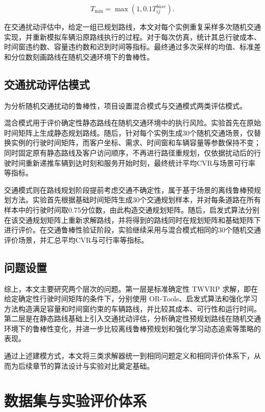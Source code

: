\documentclass[12pt,a4paper,UTF8]{article}
\begin{document}
\begin{equation}
    T_{\min}=\max(1,0.1T^{base}_{ij}).
    \label{eq:traffic_lower_bound}
\end{equation}

在交通扰动评估中，给定一组已规划路线，本文对每个实例重复采样多次随机交通实现，并重新模拟车辆沿原路线执行的过程。对于每次仿真，统计其总行驶成本、时间窗违约数、容量违约数和迟到时间等指标。最终通过多次采样的均值、标准差和分位数刻画路线在随机交通环境下的鲁棒性。

\subsection{交通扰动评估模式}
为分析随机交通扰动的鲁棒性，项目设置混合模式与交通模式两类评估模式。

混合模式用于评价确定性静态路线在随机交通环境中的执行风险。实验首先在原始时间矩阵上生成静态规划路线。随后，针对每个实例生成30个随机交通场景，仅替换实例的行驶时间矩阵，而客户坐标、需求、时间窗和车辆容量等参数保持不变；同时固定原有静态路线及客户访问顺序，不再进行路径重规划，仅依据扰动后的行驶时间重新递推车辆到达时刻和服务开始时刻，最终统计平均CVR与场景可行率等指标。

交通模式则在路线规划阶段提前考虑交通不确定性，属于基于场景的离线鲁棒预规划方法。实验首先根据基础时间矩阵生成30个交通规划样本，并对每条道路在所有样本中的行驶时间取0.75分位数，由此构造交通规划矩阵。随后，启发式算法分别在该交通规划矩阵上重新求解路线，并将得到的路线同时在规划矩阵和基础矩阵下进行评价。在交通鲁棒性验证阶段，实验继续采用与混合模式相同的30个随机交通评价场景，并汇总平均CVR与可行率等指标。

\subsection{问题设置}

综上，本文主要研究两个层次的问题。第一层是标准确定性 TWVRP 求解，即在给定确定性行驶时间矩阵的条件下，分别使用 OR-Tools、启发式算法和强化学习方法构造满足容量和时间窗约束的车辆路线，并比较其成本、可行性和运行时间。第二层是在静态路线基础上引入交通扰动评估，分析确定性预规划路线在随机交通环境下的鲁棒性变化，并进一步比较离线鲁棒预规划和强化学习动态追索等策略的表现。

通过上述建模方式，本文将三类求解器统一到相同问题定义和相同评价体系下，从而为后续章节的算法设计与实验对比奠定基础。

\section{数据集与实验评价体系}
\label{sec:dataset_eval}
\end{document}
